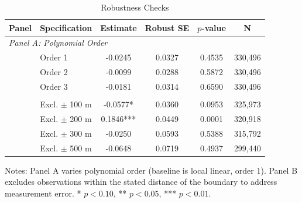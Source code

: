 \begin{table}[H]
\centering
\caption{Robustness Checks}
\begin{threeparttable}
\begin{tabular}{llcccc}
\toprule
Panel & Specification & Estimate & Robust SE & $p$-value & N \\
\midrule
\multicolumn{6}{l}{\textit{Panel A: Polynomial Order}} \\
 & Order  1  &  -0.0245  &  0.0327  &  0.4535  &  330,496  \\
 & Order  2  &  -0.0099  &  0.0288  &  0.5872  &  330,496  \\
 & Order  3  &  -0.0181  &  0.0314  &  0.6590  &  330,496  \\
\addlinespace
\multicolumn{6}{l}{\textit{Panel B: Donut Hole}} \\
 & Excl. $\pm$ 100 m &  -0.0577*  &  0.0360  &  0.0953  &  325,973  \\
 & Excl. $\pm$ 200 m &  0.1846***  &  0.0449  &  0.0001  &  320,918  \\
 & Excl. $\pm$ 300 m &  -0.0250  &  0.0593  &  0.5388  &  315,792  \\
 & Excl. $\pm$ 500 m &  -0.0648  &  0.0719  &  0.4937  &  299,440  \\
\bottomrule
\end{tabular}
\begin{tablenotes}[flushleft]
\small
\item Notes: Panel A varies polynomial order (baseline is local linear, order 1).  Panel B excludes observations within the stated distance of the boundary to address  measurement error.  * $p<0.10$, ** $p<0.05$, *** $p<0.01$.
\end{tablenotes}
\end{threeparttable}
\label{tab:robustness}
\end{table}
